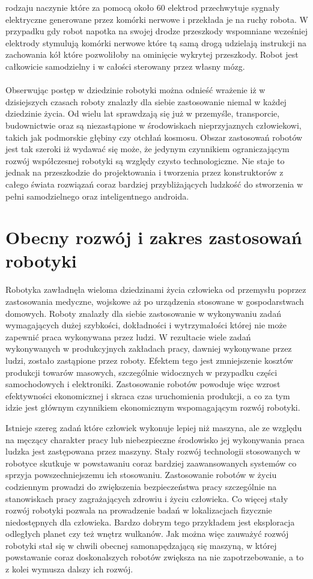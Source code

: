 rodzaju naczynie które za pomocą około 60 elektrod przechwytuje sygnały
elektryczne generowane przez komórki nerwowe i przekłada je na ruchy robota. W
przypadku gdy robot napotka na swojej drodze przeszkody wspomniane
wcześniej elektrody stymulują komórki nerwowe które tą samą drogą udzielają
instrukcji na zachowania kół które pozwoliłoby na ominięcie wykrytej przeszkody. Robot jest
całkowicie samodzielny i w całości sterowany przez własny mózg.\\
\\
Obserwując postęp w dziedzinie robotyki można odnieść wrażenie iż w dzisiejszych
czasach roboty znalazły dla siebie zastosowanie niemal w każdej dziedzinie życia.
Od wielu lat sprawdzają się już w przemyśle, transporcie, budownictwie oraz są
niezastąpione w środowiskach nieprzyjaznych człowiekowi, takich jak podmorskie
głębiny czy otchłań kosmosu. Obszar zastosowań robotów jest tak szeroki iż
wydawać się może, że jedynym czynnikiem ograniczającym rozwój współczesnej
robotyki są względy czysto technologiczne. Nie staje to jednak na przeszkodzie do
projektowania i tworzenia przez konstruktorów z całego świata rozwiązań coraz
bardziej przybliżających ludzkość do stworzenia w pełni samodzielnego oraz
inteligentnego androida.
\section{Obecny rozwój i zakres zastosowań robotyki}
Robotyka zawładnęła wieloma dziedzinami życia człowieka od przemysłu poprzez
zastosowania medyczne, wojskowe aż po urządzenia stosowane w gospodarstwach
domowych. Roboty znalazły dla siebie zastosowanie w wykonywaniu zadań
wymagających dużej szybkości, dokładności i wytrzymałości której nie może
zapewnić praca wykonywana przez ludzi. W rezultacie wiele zadań wykonywanych w
produkcyjnych zakładach pracy, dawniej wykonywane przez ludzi, zostało zastąpione
przez roboty. Efektem tego jest zmniejszenie kosztów produkcji towarów masowych,
szczególnie widocznych w przypadku części samochodowych i elektroniki.
Zastosowanie robotów powoduje więc wzrost efektywności ekonomicznej i skraca czas
uruchomienia produkcji, a co za tym idzie jest głównym czynnikiem ekonomicznym wspomagającym rozwój robotyki.

Istnieje szereg zadań które człowiek wykonuje lepiej niż maszyna,
ale ze względu na męczący charakter pracy lub niebezpieczne środowisko jej wykonywania praca
ludzka jest zastępowana przez maszyny. Stały rozwój technologii stosowanych w
robotyce skutkuje w powstawaniu coraz bardziej zaawansowanych systemów co sprzyja
powszechniejszemu ich stosowaniu. Zastosowanie robotów w życiu codziennym
prowadzi do zwiększenia bezpieczeństwa pracy szczególnie na stanowiskach pracy
zagrażających zdrowiu i życiu człowieka. Co więcej stały rozwój robotyki pozwala
na prowadzenie badań w lokalizacjach fizycznie niedostępnych dla człowieka.
Bardzo dobrym tego przykładem jest eksploracja odległych planet czy też wnętrz
wulkanów. Jak można więc zauważyć rozwój robotyki stał się w chwili obecnej
samonapędzającą się maszyną, w której powstawanie coraz doskonalszych robotów
zwiększa na nie zapotrzebowanie, a to z kolei wymusza dalszy ich rozwój.
